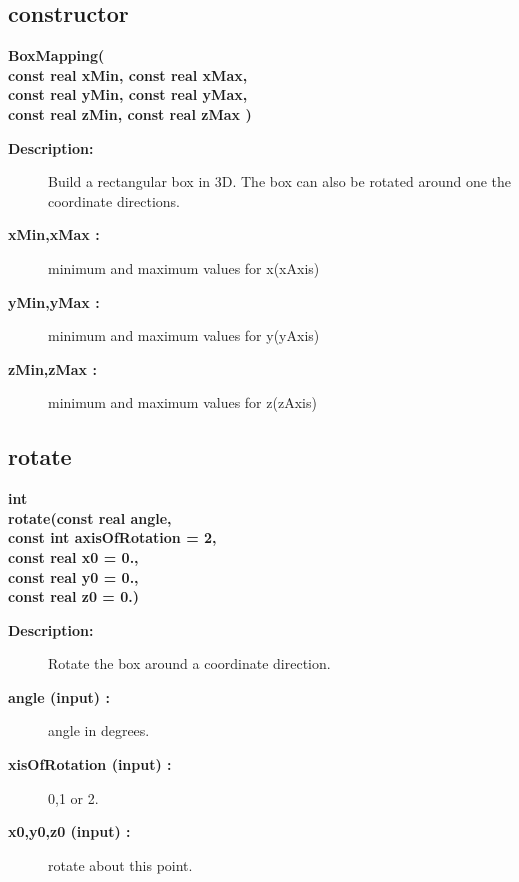 \subsection{constructor}
 
\newlength{\BoxMappingIncludeArgIndent}
\begin{flushleft} \textbf{%
\settowidth{\BoxMappingIncludeArgIndent}{BoxMapping(}%
BoxMapping( \\ 
\hspace{\BoxMappingIncludeArgIndent}const real xMin, const real xMax, \\ 
\hspace{\BoxMappingIncludeArgIndent}const real yMin, const real yMax,\\ 
\hspace{\BoxMappingIncludeArgIndent}const real zMin, const real zMax ) 
}\end{flushleft}
\begin{description}
\item[{\bf Description:}] 
    Build a rectangular box in 3D. The box can also be rotated
  around one the coordinate directions.
\item[{\bf xMin,xMax :}]  minimum and maximum values for x(xAxis)
\item[{\bf yMin,yMax :}]  minimum and maximum values for y(yAxis)
\item[{\bf zMin,zMax :}]  minimum and maximum values for z(zAxis)
\end{description}
\subsection{rotate}
 
\begin{flushleft} \textbf{%
int  \\ 
\settowidth{\BoxMappingIncludeArgIndent}{rotate(}%
rotate(const real angle, \\ 
\hspace{\BoxMappingIncludeArgIndent}const int axisOfRotation  = 2,\\ 
\hspace{\BoxMappingIncludeArgIndent}const real x0  = 0.,\\ 
\hspace{\BoxMappingIncludeArgIndent}const real y0  = 0.,\\ 
\hspace{\BoxMappingIncludeArgIndent}const real z0  = 0.)
}\end{flushleft}
\begin{description}
\item[{\bf Description:}] 
    Rotate the box around a coordinate direction.
\item[{\bf angle (input) :}]  angle in degrees.
\item[{\bf xisOfRotation (input) :}]  0,1 or 2.
\item[{\bf x0,y0,z0 (input) :}]  rotate about this point.
\end{description}
